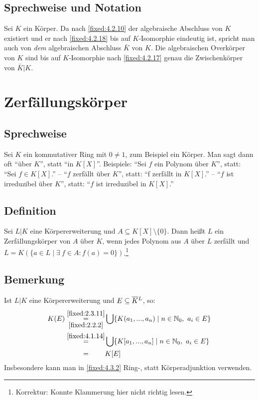 \subsection{Sprechweise und Notation} Sei $K$ ein Körper. Da nach \ref{fixed:4.2.10} der algebraische Abschluss von $K$ existiert und er nach \ref{fixed:4.2.18} bis auf $K$-Isomorphie eindeutig ist, spricht man auch von \textit{dem} algebraischen Abschluss $\bar K$ von $K$. Die algebraischen Overkörper von $K$ sind bis auf $K$-Isomorphie nach \ref{fixed:4.2.17} genau die Zwischenkörper von $\bar K|K$.

\section{Zerfällungskörper}

\subsection{Sprechweise} Sei $K$ ein kommutativer Ring mit $0 \neq 1$, zum Beispiel ein Körper. Man sagt dann oft "`über $K$"', statt "`in $K[X]$"'. Beispiele: "`Sei $f$ ein Polynom über $K$"', statt: "`Sei $f \in K[X]$."' -- "`$f$ zerfällt über $K$"', statt: "`f zerfällt in $K[X]$."' -- "`$f$ ist irreduzibel über $K$"', statt: "`$f$ ist irreduzibel in $K[X]$."'

\subsection{Definition} Sei $L|K$ eine Körpererweiterung und $A \subseteq K[X] \setminus \{0\}$. Dann heißt $L$ ein Zerfällungskörper von $A$ über $K$, wenn jedes Polynom aus $A$ über $L$ zerfällt und $L = K(\{a \in L \mid \exists~f \in A : f(a)=0\})$.\footnote{Korrektur: Konnte Klammerung hier nicht richtig lesen.}

\subsection{Bemerkung} Ist $L|K$ eine Körpererweiterung und $E \subseteq \barsmash KL$, so:
\begin{align*}
	K(E)
	\overset{\ref{fixed:2.3.11}}{\underset{\ref{fixed:2.2.2}}{=}} & \bigcup\{K(a_1,...,a_n) \mid n \in \N_0,~a_i \in E\} \\
	\overset{\ref{fixed:4.1.14}}{=} & \bigcup\{K[a_1,...,a_n] \mid n \in \N_0,~a_i \in E\} \\
	\overset{\hphantom{\ref{fixed:4.1.14}}}{=} & K[E]
\end{align*}
Insbesondere kann man in \ref{fixed:4.3.2} Ring-, statt Körperadjunktion verwenden.

